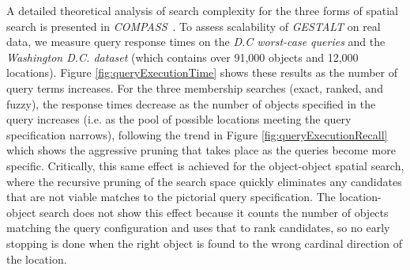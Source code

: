 A detailed theoretical analysis of search complexity for the three forms of spatial search is presented in \emph{COMPASS}~\cite{Osul2023}.
To assess scalability of \emph{GESTALT} on real data, we measure query response times on the \textit{D.C worst-case queries} and the \textit{Washington D.C. dataset} (which contains over 91,000 objects and 12,000 locations).
Figure \ref{fig:queryExecutionTime} shows these results as the number of query terms increases. 
For the three membership searches (exact, ranked, and fuzzy), the response times decrease as the number of objects specified in the query increases (i.e. as the pool of possible locations meeting the query specification narrows), following the trend in Figure \ref{fig:queryExecutionRecall} which shows the aggressive pruning that takes place as the queries become more specific.
 Critically, this same effect is achieved for the object-object spatial search, where the recursive pruning of the search space quickly eliminates any candidates that are not viable matches to the pictorial query specification.
The location-object search does not show this effect because it counts the number of objects matching the query configuration and uses that to rank candidates, so no early stopping is done when the right object is found to the wrong cardinal direction of the location. %









